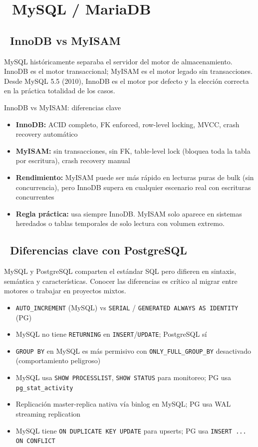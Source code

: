 \chapter[MySQL / MariaDB]{~MySQL / MariaDB}

\section[InnoDB vs MyISAM]{~InnoDB vs MyISAM}

MySQL históricamente separaba el servidor del motor de almacenamiento.
InnoDB es el motor transaccional; MyISAM es el motor legado sin transacciones.
Desde MySQL 5.5 (2010), InnoDB es el motor por defecto y la elección correcta en la práctica totalidad de los casos.

\begin{teoriabox}{InnoDB vs MyISAM: diferencias clave}
\begin{itemize}
  \item \textbf{InnoDB:} ACID completo, FK enforced, row-level locking, MVCC, crash recovery automático
  \item \textbf{MyISAM:} sin transacciones, sin FK, table-level lock (bloquea toda la tabla por escritura), crash recovery manual
  \item \textbf{Rendimiento:} MyISAM puede ser más rápido en lecturas puras de bulk (sin concurrencia), pero InnoDB supera en cualquier escenario real con escrituras concurrentes
  \item \textbf{Regla práctica:} usa siempre InnoDB. MyISAM solo aparece en sistemas heredados o tablas temporales de solo lectura con volumen extremo.
\end{itemize}
\end{teoriabox}

\section[Diferencias clave con PostgreSQL]{~Diferencias clave con PostgreSQL}

MySQL y PostgreSQL comparten el estándar SQL pero difieren en sintaxis, semántica y características.
Conocer las diferencias es crítico al migrar entre motores o trabajar en proyectos mixtos.

\begin{itemize}
  \item \texttt{AUTO\_INCREMENT} (MySQL) vs \texttt{SERIAL} / \texttt{GENERATED ALWAYS AS IDENTITY} (PG)
  \item MySQL no tiene \texttt{RETURNING} en \texttt{INSERT}/\texttt{UPDATE}; PostgreSQL sí
  \item \texttt{GROUP BY} en MySQL es más permisivo con \texttt{ONLY\_FULL\_GROUP\_BY} desactivado (comportamiento peligroso)
  \item MySQL usa \texttt{SHOW PROCESSLIST}, \texttt{SHOW STATUS} para monitoreo; PG usa \texttt{pg\_stat\_activity}
  \item Replicación master-replica nativa vía binlog en MySQL; PG usa WAL streaming replication
  \item MySQL tiene \texttt{ON DUPLICATE KEY UPDATE} para upserts; PG usa \texttt{INSERT ... ON CONFLICT}
\end{itemize}


